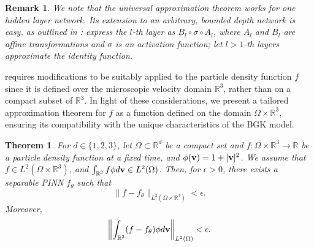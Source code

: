 \documentclass[preprint,12pt]{elsarticle}
\newtheorem{theorem}{Theorem}
\newtheorem*{remark}{Remark}
\begin{document}
\begin{remark}
    We note that the universal approximation theorem \cite{cybenko1989approximation} works for one hidden layer network.
    Its extension to an arbitrary, bounded depth network is easy, as outlined in \cite{kidger2020universal}:
    express the $l$-th layer as $B_l \circ \sigma \circ A_l$,
    where $A_l$ and $B_l$ are affine transformations and $\sigma$ is an activation function;
    let $l>1$-th layers approximate the identity function.
\end{remark}


 requires modifications to be suitably applied to the particle density function $f$ since it is defined over the microscopic velocity domain $\mathbb{R}^3$, rather than on a compact subset of $\mathbb{R}^3$. 
In light of these considerations, we present a tailored approximation theorem for $f$ as a function defined on the domain $\Omega \times \mathbb{R}^3$, ensuring its compatibility with the unique characteristics of the BGK model.


\begin{theorem}\label{thm:uat_spinn_f}
    For $d \in \{1, 2, 3\}$,
    let $\Omega \subset \mathbb{R}^d$ be a compact set and $f: \Omega \times \mathbb{R}^3 \rightarrow \mathbb{R}$ be a particle density function at a fixed time, and $\phi({\bf v}) = 1 + |{\bf v}|^2$.
    We assume that $f \in L^2(\Omega \times \mathbb{R}^3)$,
    and $\int_{\mathbb{R}^3} f\phi d{\bf v} \in L^2(\Omega)$.
    Then, for $\epsilon >0$, there exists a separable PINN $f_\theta$ such that
    \[
        \| f - f_\theta \|_{L^2(\Omega \times \mathbb{R}^3)} < \epsilon.
    \]
    Moreover, 
    \[
        \left\|\int_{\mathbb{R}^3} (f - f_\theta)\phi d{\bf v}\right\|_{L^2(\Omega)} < \epsilon.
    \]
\end{theorem}
\end{document}
